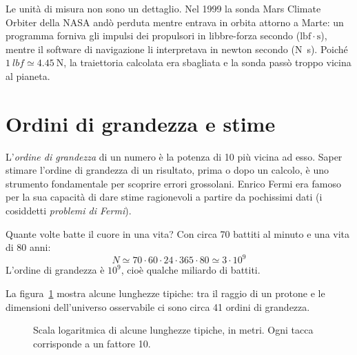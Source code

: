 \begin{Es}
  Le unità di misura non sono un dettaglio. Nel 1999 la sonda Mars Climate Orbiter della NASA andò perduta mentre entrava in orbita attorno a Marte: un programma forniva gli impulsi dei propulsori in libbre-forza secondo ($\mathrm{lbf}\cdot\mathrm{s}$), mentre il software di navigazione li interpretava in newton secondo (\si{\newton\second}). Poiché $\SI{1}{lbf}\simeq\SI{4.45}{\newton}$, la traiettoria calcolata era sbagliata e la sonda passò troppo vicina al pianeta.
\end{Es}

\section{Ordini di grandezza e stime}
L'\emph{ordine di grandezza} di un numero è la potenza di 10 più vicina ad esso. Saper stimare l'ordine di grandezza di un risultato, prima o dopo un calcolo, è uno strumento fondamentale per scoprire errori grossolani. Enrico Fermi era famoso per la sua capacità di dare stime ragionevoli a partire da pochissimi dati (i cosiddetti \emph{problemi di Fermi}).

\begin{Es}
  Quante volte batte il cuore in una vita? Con circa 70 battiti al minuto e una vita di 80 anni:
  \[ N\simeq 70\cdot 60\cdot 24\cdot 365\cdot 80\simeq 3\cdot10^9 \]
  L'ordine di grandezza è $10^9$, cioè qualche miliardo di battiti.
\end{Es}

La figura~\ref{fig:scala_lunghezze} mostra alcune lunghezze tipiche: tra il raggio di un protone e le dimensioni dell'universo osservabile ci sono circa 41 ordini di grandezza.
\begin{figure}[htbp]
  \centering
  \caption{Scala logaritmica di alcune lunghezze tipiche, in metri. Ogni tacca corrisponde a un fattore 10.}
  \label{fig:scala_lunghezze}
\end{figure}

